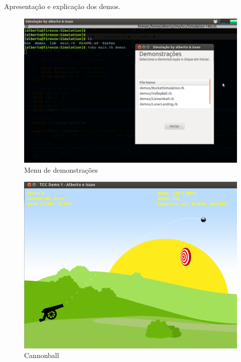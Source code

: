 Apresentação e explicação dos demos.


\begin{figure}
	\centering
	\caption{Menu de demonstrações}
	\includegraphics[scale=0.4]{images/demos-menu.png}
	\hspace{0.5cm}
\end{figure}


\begin{figure}
	\centering
	\caption{Cannonball}
	\includegraphics[scale=0.4]{images/cannonball.png}
	\hspace{0.5cm}
\end{figure}


